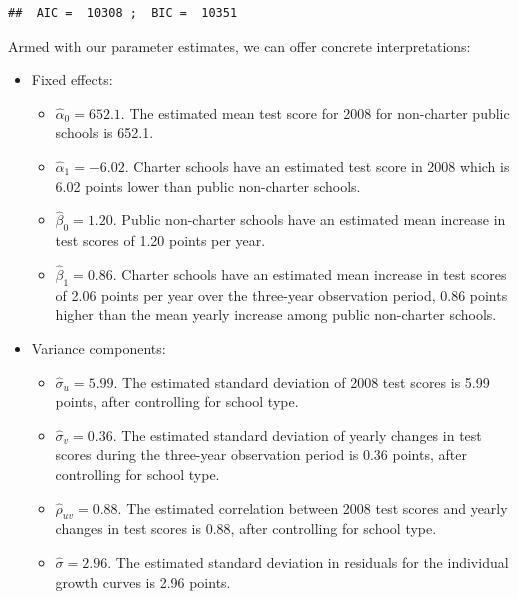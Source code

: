 \documentclass[
]{krantz}
\providecommand{\tightlist}{%
  \setlength{\itemsep}{0pt}\setlength{\parskip}{0pt}}
\begin{document}
\begin{verbatim}
##  AIC =  10308 ;  BIC =  10351
\end{verbatim}

Armed with our parameter estimates, we can offer concrete interpretations:

\begin{itemize}
\item
  Fixed effects:

  \begin{itemize}
  \tightlist
  \item
    \(\hat{\alpha}_{0} = 652.1.\) The estimated mean test score for 2008 for non-charter public schools is 652.1.
  \item
    \(\hat{\alpha}_{1}= -6.02.\) Charter schools have an estimated test score in 2008 which is 6.02 points lower than public non-charter schools.
  \item
    \(\hat{\beta}_{0}= 1.20.\) Public non-charter schools have an estimated mean increase in test scores of 1.20 points per year.
  \item
    \(\hat{\beta}_{1}= 0.86.\) Charter schools have an estimated mean increase in test scores of 2.06 points per year over the three-year observation period, 0.86 points higher than the mean yearly increase among public non-charter schools.
  \end{itemize}
\item
  Variance components:

  \begin{itemize}
  \tightlist
  \item
    \(\hat{\sigma}_u= 5.99.\) The estimated standard deviation of 2008 test scores is 5.99 points, after controlling for school type.
  \item
    \(\hat{\sigma}_v= 0.36.\) The estimated standard deviation of yearly changes in test scores during the three-year observation period is 0.36 points, after controlling for school type.
  \item
    \(\hat{\rho}_{uv}= 0.88.\) The estimated correlation between 2008 test scores and yearly changes in test scores is 0.88, after controlling for school type.
  \item
    \(\hat{\sigma}= 2.96.\) The estimated standard deviation in residuals for the individual growth curves is 2.96 points.
  \end{itemize}
\end{itemize}
\end{document}

